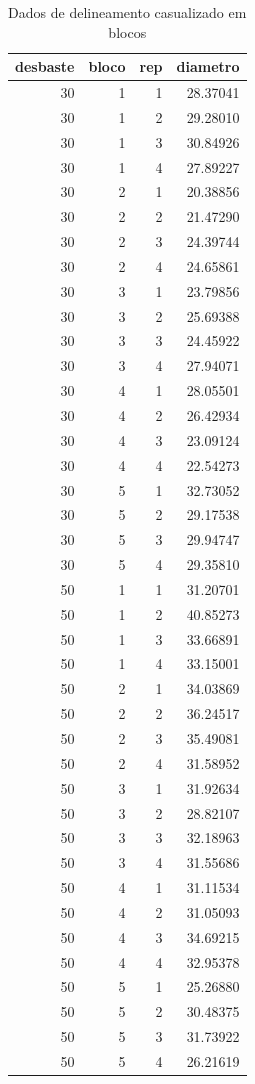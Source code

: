 \documentclass[
]{article}
\begin{document}
\begin{table}

\caption{\label{tab:unnamed-chunk-62}Dados de delineamento casualizado em blocos}
\centering
\begin{tabular}[t]{r|r|r|r}
\hline
desbaste & bloco & rep & diametro\\
\hline
30 & 1 & 1 & 28.37041\\
\hline
30 & 1 & 2 & 29.28010\\
\hline
30 & 1 & 3 & 30.84926\\
\hline
30 & 1 & 4 & 27.89227\\
\hline
30 & 2 & 1 & 20.38856\\
\hline
30 & 2 & 2 & 21.47290\\
\hline
30 & 2 & 3 & 24.39744\\
\hline
30 & 2 & 4 & 24.65861\\
\hline
30 & 3 & 1 & 23.79856\\
\hline
30 & 3 & 2 & 25.69388\\
\hline
30 & 3 & 3 & 24.45922\\
\hline
30 & 3 & 4 & 27.94071\\
\hline
30 & 4 & 1 & 28.05501\\
\hline
30 & 4 & 2 & 26.42934\\
\hline
30 & 4 & 3 & 23.09124\\
\hline
30 & 4 & 4 & 22.54273\\
\hline
30 & 5 & 1 & 32.73052\\
\hline
30 & 5 & 2 & 29.17538\\
\hline
30 & 5 & 3 & 29.94747\\
\hline
30 & 5 & 4 & 29.35810\\
\hline
50 & 1 & 1 & 31.20701\\
\hline
50 & 1 & 2 & 40.85273\\
\hline
50 & 1 & 3 & 33.66891\\
\hline
50 & 1 & 4 & 33.15001\\
\hline
50 & 2 & 1 & 34.03869\\
\hline
50 & 2 & 2 & 36.24517\\
\hline
50 & 2 & 3 & 35.49081\\
\hline
50 & 2 & 4 & 31.58952\\
\hline
50 & 3 & 1 & 31.92634\\
\hline
50 & 3 & 2 & 28.82107\\
\hline
50 & 3 & 3 & 32.18963\\
\hline
50 & 3 & 4 & 31.55686\\
\hline
50 & 4 & 1 & 31.11534\\
\hline
50 & 4 & 2 & 31.05093\\
\hline
50 & 4 & 3 & 34.69215\\
\hline
50 & 4 & 4 & 32.95378\\
\hline
50 & 5 & 1 & 25.26880\\
\hline
50 & 5 & 2 & 30.48375\\
\hline
50 & 5 & 3 & 31.73922\\
\hline
50 & 5 & 4 & 26.21619\\
\hline
\end{tabular}
\end{table}
\end{document}
